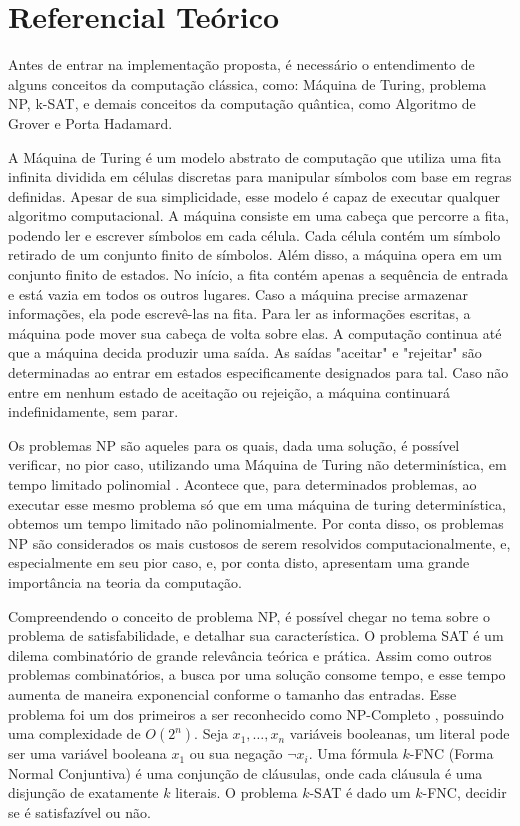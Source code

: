 \documentclass[12pt]{article}
\begin{document}
\section{Referencial Teórico}

Antes de entrar na implementação proposta, é necessário o entendimento de alguns conceitos da computação clássica, como: Máquina de Turing, problema NP, k-SAT, e demais conceitos da computação quântica, como Algoritmo de Grover e Porta Hadamard.

\cite{sipser:07} A Máquina de Turing é um modelo abstrato de computação que utiliza uma fita infinita dividida em células discretas para manipular símbolos com base em regras definidas. Apesar de sua simplicidade, esse modelo é capaz de executar qualquer algoritmo computacional. A máquina consiste em uma cabeça que percorre a fita, podendo ler e escrever símbolos em cada célula. Cada célula contém um símbolo retirado de um conjunto finito de símbolos. Além disso, a máquina opera em um conjunto finito de estados. No início, a fita contém apenas a sequência de entrada e está vazia em todos os outros lugares. Caso a máquina precise armazenar informações, ela pode escrevê-las na fita. Para ler as informações escritas, a máquina pode mover sua cabeça de volta sobre elas. A computação continua até que a máquina decida produzir uma saída. As saídas "aceitar" e "rejeitar" são determinadas ao entrar em estados especificamente designados para tal. Caso não entre em nenhum estado de aceitação ou rejeição, a máquina continuará indefinidamente, sem parar.

Os problemas NP são aqueles para os quais, dada uma solução, é possível verificar, no pior caso,  utilizando uma Máquina de Turing não determinística, em tempo limitado polinomial \cite{sipser:07}. Acontece que, para determinados problemas, ao executar esse mesmo problema só que em uma máquina de turing determinística, obtemos um tempo limitado não polinomialmente. Por conta disso, os problemas NP são considerados os mais custosos de serem resolvidos computacionalmente, e, especialmente em seu pior caso, e, por conta disto, apresentam uma grande importância na teoria da computação.

Compreendendo o conceito de problema NP, é possível chegar no tema sobre o problema de satisfabilidade, e detalhar sua característica. O problema SAT é um dilema combinatório de grande relevância teórica e prática. Assim como outros problemas combinatórios, a busca por uma solução consome tempo, e esse tempo aumenta de maneira exponencial conforme o tamanho das entradas. Esse problema foi um dos primeiros a ser reconhecido como NP-Completo \cite{cook:71}, possuindo uma complexidade de $O(2^n)$. Seja \(x_1, \ldots, x_n\) variáveis booleanas, um literal pode ser uma variável booleana \(x_1\) ou sua negação \(\neg x_i\). Uma fórmula $k$-FNC (Forma Normal Conjuntiva) é uma conjunção de cláusulas, onde cada cláusula é uma disjunção de exatamente $k$ literais. O problema $k$-SAT é dado um $k$-FNC, decidir se é satisfazível ou não.
\end{document}
